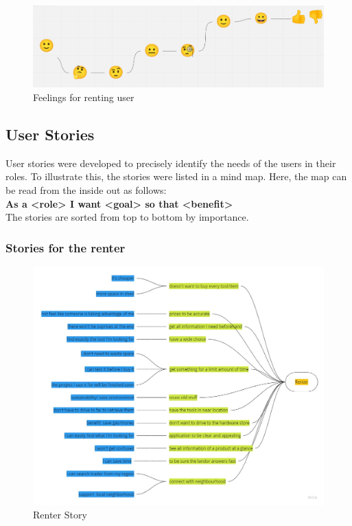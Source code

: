 			\begin{figure}[H]
				\centering
				\includegraphics[width=\linewidth]{abb/2_context_of_use/feelings_lending.png}
				\caption{Feelings for renting user}
				\label{fig:ujm_lending_feelings}
			\end{figure}

\subsection{User Stories}


User stories were developed to precisely identify the needs of the users in their roles. To illustrate this, the stories were listed in a mind map. Here, the map can be read from the inside out as follows:\\
\textbf {As a \colorbox{role}{<role>} I want \colorbox{goal}{<goal>} so that \colorbox{benefit}{<benefit>}}\\
The stories are sorted from top to bottom by importance.

\subsubsection{Stories for the renter}
\begin{figure}[H]
	\centering
	\includegraphics[width=\linewidth]{abb/2_context_of_use/story_renting.jpg}
	\caption{Renter Story}
	\label{fig:story_renter}
\end{figure}


